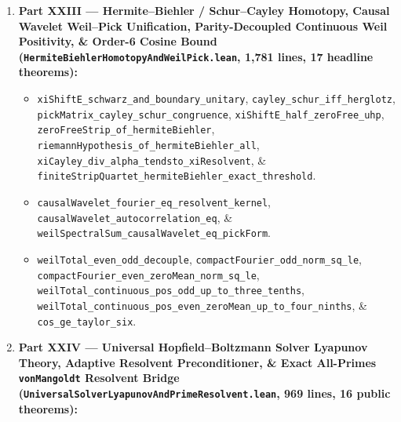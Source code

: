 \documentclass[
  11pt,
]{article}
\providecommand{\tightlist}{%
  \setlength{\itemsep}{0pt}\setlength{\parskip}{0pt}}
\begin{document}
\begin{enumerate}
  \begin{itemize}
  \tightlist
  \item
    \texttt{norm\_exp\_neg\_I\_sub\_taylor\_le},
    \texttt{exists\_pow\_div\_factorial\_lt},
    \texttt{compactFourier\_norm\_sq\_le\_of\_moment\_orthog},
    \texttt{weilPrime\_refined\_norm\_bound},
    \texttt{weilTotal\_universal\_finite\_codim\_coercive}, \&
    \texttt{weilTotal\_strict\_pos\_on\_finite\_codim}.
  \item
    \texttt{xiResolvent\_im\_eq\_logForce\_half},
    \texttt{xiResolvent\_im\_eq\_phase\_deriv\_gamma},
    \texttt{riemannHypothesis\_of\_xiResolventHerglotz},
    \texttt{resolventCritSum\_herglotz\_and\_schwarzPick},
    \texttt{resolventCritSum\_pickMatrix\_psd},
    \texttt{resolventCritSum\_idos\_integral}, \&
    \texttt{resolventOfflinePair\_exact\_and\_remote\_violation}.
  \item
    \texttt{lightCone\_even\_power\_parity\_identity},
    \texttt{riemannHypothesis\_local\_and\_simple\_of\_hessianPos},
    \texttt{stripAngle\_geometry\_and\_barrier},
    \texttt{xiNormSq\_angular\_deriv\_eq}, \&
    \texttt{riemannHypothesis\_of\_angularDescent}.
  \end{itemize}
\item
  \textbf{Part XXIII --- Hermite--Biehler / Schur--Cayley Homotopy,
  Causal Wavelet Weil--Pick Unification, Parity-Decoupled Continuous
  Weil Positivity, \& Order-6 Cosine Bound
  (\texttt{HermiteBiehlerHomotopyAndWeilPick.lean}, 1,781 lines, 17
  headline theorems):}

  \begin{itemize}
  \tightlist
  \item
    \texttt{xiShiftE\_schwarz\_and\_boundary\_unitary},
    \texttt{cayley\_schur\_iff\_herglotz},
    \texttt{pickMatrix\_cayley\_schur\_congruence},
    \texttt{xiShiftE\_half\_zeroFree\_uhp},
    \texttt{zeroFreeStrip\_of\_hermiteBiehler},
    \texttt{riemannHypothesis\_of\_hermiteBiehler\_all},
    \texttt{xiCayley\_div\_alpha\_tendsto\_xiResolvent}, \&
    \texttt{finiteStripQuartet\_hermiteBiehler\_exact\_threshold}.
  \item
    \texttt{causalWavelet\_fourier\_eq\_resolvent\_kernel},
    \texttt{causalWavelet\_autocorrelation\_eq}, \&
    \texttt{weilSpectralSum\_causalWavelet\_eq\_pickForm}.
  \item
    \texttt{weilTotal\_even\_odd\_decouple},
    \texttt{compactFourier\_odd\_norm\_sq\_le},
    \texttt{compactFourier\_even\_zeroMean\_norm\_sq\_le},
    \texttt{weilTotal\_continuous\_pos\_odd\_up\_to\_three\_tenths},
    \texttt{weilTotal\_continuous\_pos\_even\_zeroMean\_up\_to\_four\_ninths},
    \& \texttt{cos\_ge\_taylor\_six}.
  \end{itemize}
\item
  \textbf{Part XXIV --- Universal Hopfield--Boltzmann Solver Lyapunov
  Theory, Adaptive Resolvent Preconditioner, \& Exact All-Primes
  \texttt{vonMangoldt} Resolvent Bridge
  (\texttt{UniversalSolverLyapunovAndPrimeResolvent.lean}, 969 lines, 16
  public theorems):}


\end{enumerate}
\end{document}
